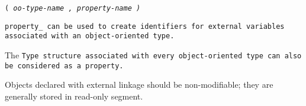
\s\tt{(} \it{oo-type-name} \tt{,} \it{property-name} \tt{)}


\tt{property_} can be used to create identifiers for
external variables associated with an object-oriented type.

\note The \tt{Type} structure associated with every
object-oriented type can also be considered as a property.


Objects declared with external linkage should be non-modifiable;
they are generally stored in read-only segment.

\enlargethispage*{\baselineskip}
\pagebreak
